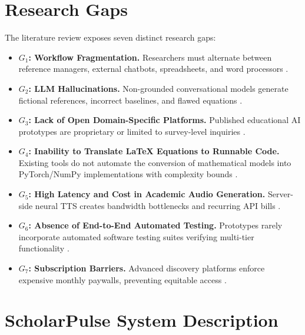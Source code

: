 \documentclass[conference]{IEEEtran}
\begin{document}
\section{Research Gaps}
The literature review exposes seven distinct research gaps:
\begin{itemize}
    \item \textbf{$G_1$: Workflow Fragmentation.} Researchers must alternate between reference managers, external chatbots, spreadsheets, and word processors \cite{alharbi2024, sharma2024}.
    \item \textbf{$G_2$: LLM Hallucinations.} Non-grounded conversational models generate fictional references, incorrect baselines, and flawed equations \cite{ji2023, gao2024}.
    \item \textbf{$G_3$: Lack of Open Domain-Specific Platforms.} Published educational AI prototypes are proprietary or limited to survey-level inquiries \cite{ogunleye2025, alqahtani2024}.
    \item \textbf{$G_4$: Inability to Translate LaTeX Equations to Runnable Code.} Existing tools do not automate the conversion of mathematical models into PyTorch/NumPy implementations with complexity bounds \cite{gemini2024}.
    \item \textbf{$G_5$: High Latency and Cost in Academic Audio Generation.} Server-side neural TTS creates bandwidth bottlenecks and recurring API bills \cite{tan2023, kaur2024}.
    \item \textbf{$G_6$: Absence of End-to-End Automated Testing.} Prototypes rarely incorporate automated software testing suites verifying multi-tier functionality \cite{ogunleye2025}.
    \item \textbf{$G_7$: Subscription Barriers.} Advanced discovery platforms enforce expensive monthly paywalls, preventing equitable access \cite{sharma2024}.
\end{itemize}

\section{ScholarPulse System Description}
\end{document}
